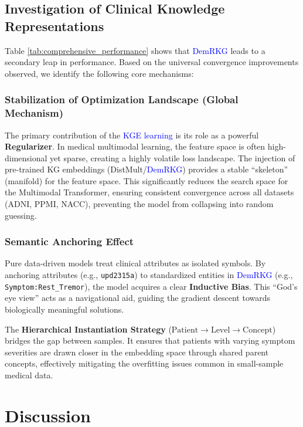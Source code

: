 \documentclass[lettersize,journal]{IEEEtran}
\begin{document}
\subsection{Investigation of Clinical Knowledge Representations}

Table \ref{tab:comprehensive_performance} shows that \textcolor{blue}{DemRKG} leads to a secondary leap in performance. Based on the universal convergence improvements observed, we identify the following core mechanisms:

\subsubsection{Stabilization of Optimization Landscape (Global Mechanism)}
    
The primary contribution of the \textcolor{blue}{KGE learning} is its role as a powerful \textbf{Regularizer}. In medical multimodal learning, the feature space is often high-dimensional yet sparse, creating a highly volatile loss landscape. The injection of pre-trained KG embeddings (DistMult/\textcolor{blue}{DemRKG}) provides a stable ``skeleton'' (manifold) for the feature space. This significantly reduces the search space for the Multimodal Transformer, ensuring consistent convergence across all datasets (ADNI, PPMI, NACC), preventing the model from collapsing into random guessing.

\subsubsection{Semantic Anchoring Effect}

Pure data-driven models treat clinical attributes as isolated symbols. By anchoring attributes (e.g., \texttt{upd2315a}) to standardized entities in \textcolor{blue}{DemRKG} (e.g., \texttt{Symptom:Rest\_Tremor}), the model acquires a clear \textbf{Inductive Bias}. This ``God's eye view'' acts as a navigational aid, guiding the gradient descent towards biologically meaningful solutions.

The \textbf{Hierarchical Instantiation Strategy} ($\text{Patient} \to \text{Level} \to \text{Concept}$) bridges the gap between samples. It ensures that patients with varying symptom severities are drawn closer in the embedding space through shared parent concepts, effectively mitigating the overfitting issues common in small-sample medical data.


\section{Discussion}
\end{document}
